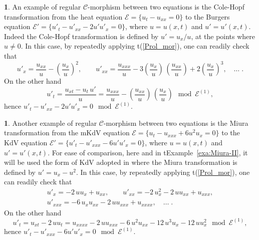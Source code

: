 \documentclass[12pt,english]{elsarticle}
\theoremstyle{plain}
\theoremstyle{plain}
\theoremstyle{remark}
\theoremstyle{plain}
\theoremstyle{definition}
\theoremstyle{definition}
\newtheorem{example}[thm]{\protect\examplename}
\providecommand{\examplename}{Example}
\begin{document}
\begin{example}
\label{exa:Cole-Hopf-I}%
An example of regular $\mathcal{C}$-morphism between two equations is the
Cole-Hopf transformation from the heat equation
$\mathcal{E}=\{u_{t}-u_{xx}=0\}$ to the Burgers equation
$\mathcal{E}'=\{u'_{t}-u'_{xx}-2u'u'_{x}=0\}$, where $u=u(x,t)$ and
$u'=u'(x,t)$. Indeed the Cole-Hopf transformation is defined by
$u'=u_{x}/u$, at the points where $u\neq 0$. In this case, by repeatedly
applying t{(\ref{Prol_mor})}, one can readily check that
%
\begin{equation*}
u'_{x}=\frac{u_{xx}}{u}-\left (\frac{u_{x}}{u}\right )^{2},\qquad u'_{xx}=
\frac{u_{xxx}}{u}-3\left (\frac{u_{x}}{u}\right )\,\left (
\frac{u_{xx}}{u}\right )+2\left (\frac{u_{x}}{u}\right )^{3},\quad
\ldots \;.
\end{equation*}
%
On the other hand
%
\begin{equation*}
u'_{t}=\frac{u_{xt}-u_{t}\,u'}{u}=\frac{u_{xxx}}{u}-\left (
\frac{u_{xx}}{u}\right )\,\left (\frac{u_{x}}{u}\right )
\mod{\mathcal{E}^{(1)}},
\end{equation*}
%
hence $u'_{t}-u'_{xx}-2u'u'_{x}=0\mod{\mathcal{E}^{(1)}}$.
\end{example}



\begin{example}
\label{exa:Miura-I}%
Another example of regular $\mathcal{C}$-morphism between two equations
is the Miura transformation from the mKdV equation
$\mathcal{E}=\{u_{t}-u_{xxx}+6u^{2}u_{x}=0\}$ to the KdV equation
$\mathcal{E}'=\{u'_{t}-u'_{xxx}-6u'u'_{x}=0\}$, where $u=u(x,t)$ and
$u'=u'(x,t)$. For ease of comparison, here and in t{Example~\ref{exa:Miura-II}}, it will be used the form of KdV adopted in
\cite{Sokolov} where the Miura transformation is defined by
$u'=u_{x}-u^{2}$. In this case, by repeatedly applying t{(\ref{Prol_mor})},
one can readily check that
%
\begin{eqnarray*}[ll]
u'_{x}=-2\,uu_{x}+u_{xx},\qquad u'_{xx}=-2\,u_{x}^{2}-2\,uu_{xx}+u_{xxx},
\\ u'_{xxx}=-6\,u_{x}u_{xx}-2\,uu_{xxx}+u_{xxxx},\quad \ldots \;.
\end{eqnarray*}
%
On the other hand
%
\begin{equation*}
u'_{t}=u_{xt}-2\,uu_{t}=u_{xxxx}-2\,uu_{xxx}-6\,u^{2}u_{xx}-12\,u^{3}u_{x}-12
\,uu_{x}^{2}\mod{\mathcal{E}^{(1)}},
\end{equation*}
%
hence $u'_{t}-u'_{xxx}-6u'u'_{x}=0\mod{\mathcal{E}^{(1)}}$.
\end{example}
\end{document}
